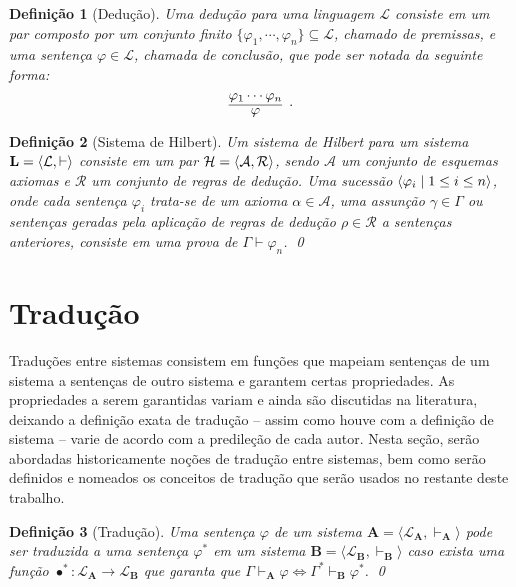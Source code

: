 \documentclass{report}
\newtheorem{definition}{Definição}
\begin{document}
    \begin{definition}[Dedução]
        Uma dedução para uma linguagem $\mathcal{L}$ consiste em um par composto por um conjunto finito $\{\varphi_1, \cdots, \varphi_n\} \subseteq \mathcal{L}$, chamado de \emph{premissas}, e uma sentença $\varphi \in \mathcal{L}$, chamada de \emph{conclusão}, que pode ser notada da seguinte forma: $$\infer[.]{\varphi}{\varphi_1 \cdots \varphi_n}$$
    \end{definition}

    \begin{definition}[Sistema de Hilbert]
        Um sistema de Hilbert para um sistema $\mathbf{L} = \langle\mathcal{L}, \vdash\rangle$ consiste em um par $\mathcal{H} = \langle\mathcal{A}, \mathcal{R}\rangle$, sendo $\mathcal{A}$ um conjunto de esquemas axiomas e $\mathcal{R}$ um conjunto de regras de dedução. Uma sucessão $\langle\varphi_i\mid 1 \leq i\leq n\rangle$, onde cada sentença $\varphi_i$ trata-se de um axioma $\alpha \in \mathcal{A}$, uma assunção $\gamma \in \Gamma$ ou sentenças geradas pela aplicação de regras de dedução $\rho \in \mathcal{R}$ a sentenças anteriores, consiste em uma prova de $\Gamma \vdash \varphi_n$.
        \qed
    \end{definition}

    \section{Tradução}

    Traduções entre sistemas consistem em funções que mapeiam sentenças de um sistema a sentenças de outro sistema e garantem certas propriedades. As propriedades a serem garantidas variam e ainda são discutidas na literatura, deixando a definição exata de tradução -- assim como houve com a definição de sistema -- varie de acordo com a predileção de cada autor. Nesta seção, serão abordadas historicamente noções de tradução entre sistemas, bem como serão definidos e nomeados os conceitos de tradução que serão usados no restante deste trabalho.

    \begin{definition}[Tradução] 
        Uma sentença $\varphi$ de um sistema $\mathbf{A} = \langle \mathcal{L}_\mathbf{A}, \vdash_\mathbf{A}\rangle$ pode ser traduzida a uma sentença $\varphi^*$ em um sistema $\mathbf{B} = \langle \mathcal{L}_\mathbf{B}, \vdash_\mathbf{B} \rangle$ caso exista uma função $\bullet^* : \mathcal{L}_\mathbf{A} \to \mathcal{L}_\mathbf{B}$ que garanta que $\Gamma \vdash_\mathbf{A} \varphi \Leftrightarrow \Gamma^* \vdash_\mathbf{B} \varphi^*$.
        \qed
    \end{definition}
\end{document}
